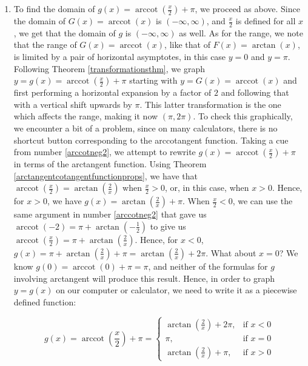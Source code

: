 {\begin{enumerate}
\begin{enumerate}

\item  To find the domain of $g(x) = \operatorname{arccot}\left(\frac{x}{2}\right) + \pi$, we proceed as above.  Since the domain of $G(x) = \operatorname{arccot}(x)$ is $(-\infty, \infty)$, and $\frac{x}{2}$ is defined for all $x$, we get that the domain of $g$ is $(-\infty, \infty)$ as well.  As for the range, we note that the range of $G(x)  = \operatorname{arccot}(x)$, like that of $F(x) = \arctan(x)$, is limited by a pair of horizontal asymptotes, in this case $y = 0$ and $y = \pi$.  Following  Theorem \ref{transformationsthm}, we graph $y =  g(x) = \operatorname{arccot}\left(\frac{x}{2}\right) + \pi$ starting with $y = G(x) = \operatorname{arccot}(x)$ and first performing a horizontal expansion by a factor of $2$ and following that with a vertical shift upwards by $\pi$.  This latter transformation is the one which affects the range, making it now $(\pi, 2\pi)$.  To check this graphically, we encounter a bit of a problem, since on many calculators, there is no shortcut button corresponding to the arccotangent function. Taking a cue from number \ref{arccotneg2}, we attempt to rewrite $g(x) = \operatorname{arccot}\left(\frac{x}{2}\right) + \pi$ in terms of the arctangent function. Using Theorem \ref{arctangentcotangentfunctionprops}, we have that $\operatorname{arccot}\left(\frac{x}{2}\right) = \arctan\left(\frac{2}{x}\right)$ when $\frac{x}{2} > 0$, or, in this case, when $x > 0$.  Hence, for $x > 0$, we have $g(x) = \arctan\left(\frac{2}{x}\right) + \pi$.  When $\frac{x}{2} < 0$, we can use the same argument in number \ref{arccotneg2} that gave us $\operatorname{arccot}(-2) = \pi + \arctan\left(-\frac{1}{2}\right)$ to give us $\operatorname{arccot}\left(\frac{x}{2}\right) = \pi + \arctan\left(\frac{2}{x}\right)$.  Hence, for $x < 0$, $g(x) = \pi + \arctan\left(\frac{2}{x}\right) + \pi = \arctan\left(\frac{2}{x}\right) + 2\pi$.  What about $x=0$?  We know $g(0) = \operatorname{arccot}(0) + \pi = \pi$, and neither of the formulas for $g$ involving arctangent will produce this result. Hence, in order to graph $y = g(x)$ on our computer or calculator, we need to write it as a piecewise defined function:

\[ g(x) = \operatorname{arccot}\left(\frac{x}{2}\right) + \pi = \left\{ \begin{array}{rr} \arctan\left(\frac{2}{x}\right) + 2\pi, & \text{if $x<0$} \\ [5pt] \pi, & \text{if $x=0$} \\ [5pt] \arctan\left(\frac{2}{x}\right) + \pi, & \text{if $x>0$} \end{array}\right. \]


\end{enumerate}
\end{enumerate}}
